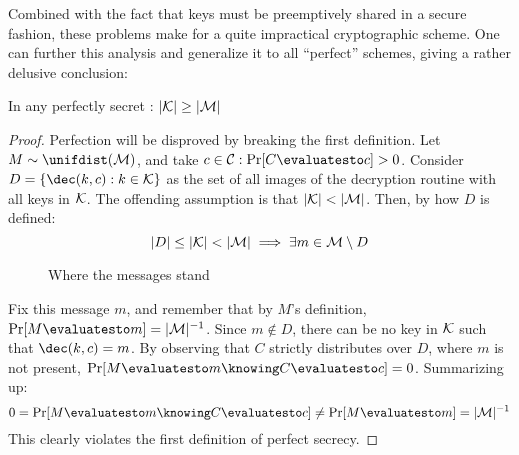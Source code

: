 
Combined with the fact that keys must be preemptively shared in a secure fashion, these problems make for a quite impractical cryptographic scheme. One can further this analysis and generalize it to all ``perfect'' schemes, giving a rather delusive conclusion:

\begin{theorem}
    In any perfectly secret \ske{}: $|\mathcal{K}| \geq |\mathcal{M}|$
\end{theorem}
\begin{proof}
    Perfection will be disproved by breaking the first definition. Let $M \sim \unifdist(\M)$, and take $c \in \C : \Pr[C \evaluatesto c] > 0$. Consider $D = \{\dec(k, c) : k \in \K\}$ as the set of all images of the decryption routine with all keys in $\mathcal{K}$. The offending assumption is that $|\mathcal{K}| < |\mathcal{M}|$. Then, by how $D$ is defined:
    \[
        |D| \leq |\mathcal{K}| < |\mathcal{M}| \implies \exists m \in \mathcal{M} \setminus D
    \]

    \begin{figure}[h]
        \centering
        \def\firstcircle{(0,0) circle (1.5cm)}
        \def\secondcircle{(60:0) circle (0.9cm)}
        \caption{Where the messages stand}
    \end{figure}

    Fix this message $m$, and remember that by $M$'s definition, $\Pr[M \evaluatesto m] = |\M|^{-1}$. Since $m \notin D$, there can be no key in $\mathcal{K}$ such that $\dec(k, c) = m$. By observing that $C$ strictly distributes over $D$, where $m$ is not present, $\Pr[M \evaluatesto m \knowing C \evaluatesto c] = 0$. Summarizing up:
    \[
        0 = \Pr[M \evaluatesto m \knowing C \evaluatesto c] \neq \Pr[M \evaluatesto m] = |\M|^{-1}
    \]
    This clearly violates the first definition of perfect secrecy.
\end{proof}
